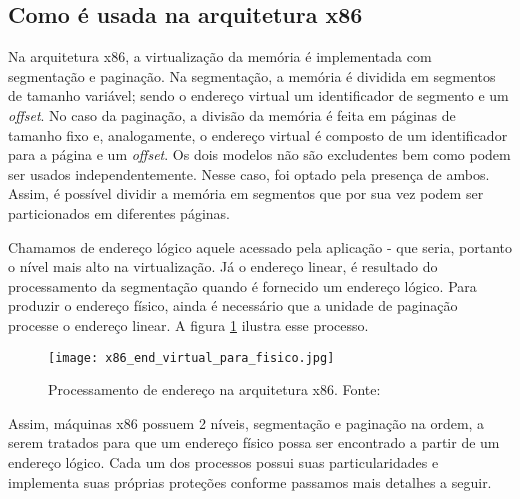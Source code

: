 		\subsection{Como é usada na arquitetura x86}		
			Na arquitetura x86, a virtualização da memória é implementada com segmentação e paginação.
			Na segmentação, a memória é dividida em segmentos de tamanho variável; sendo o endereço
			virtual um identificador de segmento e um \textsl{offset}. No caso da paginação,
			a divisão da memória é feita em páginas de tamanho fixo e, analogamente, o endereço
			virtual é composto de um identificador para a página e um \textsl{offset}.
			Os dois modelos não são excludentes bem como podem ser usados independentemente.
			Nesse caso, foi optado pela presença de ambos. Assim, é possível dividir 
			a memória em segmentos que por sua vez podem ser particionados em diferentes páginas.
			
			
			Chamamos de endereço lógico aquele acessado pela aplicação - que seria, portanto
			o nível mais alto na virtualização. Já o endereço linear, é resultado do processamento
			da segmentação quando é fornecido um endereço lógico.
			Para produzir o endereço físico, ainda é necessário que a unidade de paginação
			processe o endereço linear. A figura \ref{fig:x86_end_virtual_para_fisico} ilustra esse processo.

			\begin{figure}
				\begin{center}
					\texttt{[image: x86\_end\_virtual\_para\_fisico.jpg]}
					\caption{Processamento de endereço na arquitetura x86. Fonte: \cite{Bovet2005}}
					\label{fig:x86_end_virtual_para_fisico}
				\end{center}
			\end{figure}
			
			
			Assim, máquinas x86 possuem 2 níveis, segmentação e paginação na ordem, 
			a serem tratados para que um endereço físico possa ser encontrado a partir de um endereço lógico. 
			Cada um dos processos possui suas particularidades e implementa suas 
			próprias proteções conforme passamos mais detalhes a seguir.
		
		
